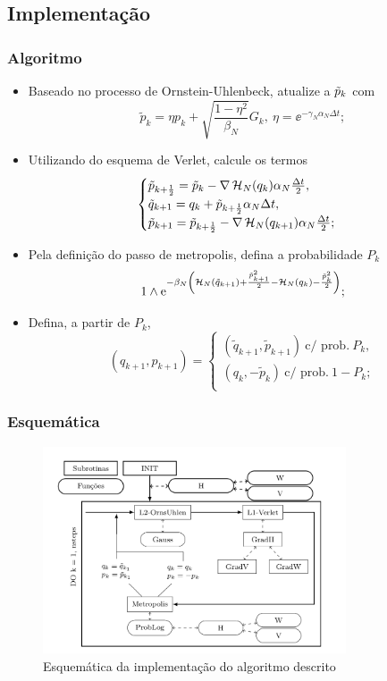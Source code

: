 \subsection{Implementação}
\begin{frame}
	\frametitle{Algoritmo}
	
		\begin{itemize}		
			\item<1> Baseado no processo de Ornstein-Uhlenbeck, atualize a $\tilde{p}_k$ com
			$$
				\tilde{p}_k = \eta p_k + \sqrt{\frac{1-\eta^2}{\beta_N}} G_k, \ \eta = \ee^{-\gamma_N \alpha_N \Delta t};
				\label{Equation: Alg Mehler}
			$$
			\item<2> Utilizando do esquema de Verlet, calcule os termos
			$$
				\begin{cases}
					\tilde{p}_{k+\frac{1}{2}} = \tilde{p}_k - \nabla \operatorname{\mathcal{H}}_N(q_k) \alpha_N \frac{\Delta t}{2}, \\
					\tilde{q}_{k+1} = q_k + \tilde{p}_{k + \frac{1}{2}} \alpha_N \Delta t, \\
					\tilde{p}_{k+1} = \tilde{p}_{k+\frac{1}{2}} - \nabla \operatorname{\mathcal{H}}_N(q_{k+1}) \alpha_N \frac{\Delta t}{2};
					\label{Equation: Alg Verlet}
				\end{cases}
			$$
			\item<3> Pela definição do passo de metropolis, defina a probabilidade $P_k$
			$$
				1 \wedge \operatorname{e}^{ -\beta_N \left( \operatorname{\mathcal{H}}_N(\tilde{q}_{k+1}) + \frac{\tilde{p}^2_{k+1}}{2} - \operatorname{\mathcal{H}}_N(q_k) - \frac{\tilde{p}^2_k}{2} \right) };
			$$
			\item<4> Defina, a partir de $P_k$, 
			$$
				(q_{k+1}, p_{k+1}) = 
				\begin{cases}
					(\tilde{q}_{k+1}, \tilde{p}_{k+1}) \ \text{c/ prob.} \ P_k, \\
					(q_k, -\tilde{p}_{k}) \ \text{c/ prob.} \ 1-P_k; \\
				\end{cases}
			$$
		\end{itemize}

\end{frame}
\begin{frame}
	\frametitle{Esquemática}
	\begin{figure}
		\centering
		\includegraphics[width=0.8\textwidth]{./media/Results/Esquematics}	
		\caption{Esquemática da implementação do algoritmo descrito}
	\end{figure}
\end{frame}
